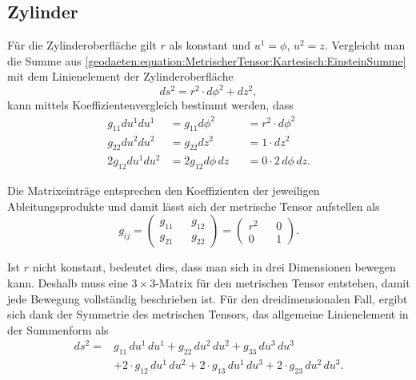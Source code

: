 %
%
%
%
\subsection{Zylinder\label{geodaeten:section:MetrischerTensor:Zylinder}}

Für die Zylinderoberfläche gilt $r$ als konstant und $u^1 = \phi$, $u^2 =z$.
Vergleicht man die Summe aus \eqref{geodaeten:equation:MetrischerTensor:Kartesisch:EinsteinSumme} mit dem Linienelement der Zylinderoberfläche
\begin{equation}
	ds^2 = r^2 \cdot d \phi^2 +dz^2 ,
\end{equation}
kann mittels Koeffizientenvergleich bestimmt werden, dass
\begin{equation}
	\begin{alignedat}{3}
		g_{11}  du^1 du^1 &= g_{11}  d \phi^2 & &= r^2 \cdot d \phi^2 \\
		g_{22}  du^2 du^2 &= g_{22}  dz^2    & &= 1 \cdot dz^2 \\
		2g_{12}  du^1 du^2 &= 2g_{12}  d \phi \, dz & &= 0 \cdot 2 \, d \phi \,  dz.
	\end{alignedat}
\end{equation}

Die Matrixeinträge entsprechen den Koeffizienten der jeweiligen Ableitungsprodukte und damit lässt sich der metrische Tensor aufstellen als
\begin{equation}
	g_{i\!j} =\begin{pmatrix} g_{11} && g_{12} \\ g_{21} && g_{22} \end{pmatrix}= \begin{pmatrix} r^2 && 0 \\ 0 && 1 \end{pmatrix} .
\end{equation}

Ist $r$ nicht konstant, bedeutet dies, dass man sich in drei Dimensionen bewegen kann.
Deshalb muss eine $3 \times 3$-Matrix für den metrischen Tensor entstehen, damit jede Bewegung vollständig beschrieben ist. 
Für den dreidimensionalen Fall, ergibt sich dank der Symmetrie des metrischen Tensors, das allgemeine Linienelement in der Summenform als
\begin{equation}
	\begin{aligned}
		ds^2 = &g_{11} \, du^1 \, du^1 + g_{22} \, du^2 \, du^2 + g_{33} \, du^3 \, du^3 \nonumber \\
		&+ 2 \cdot g_{12} \, du^1 \, du^2 + 2 \cdot g_{13} \, du^1 \, du^3 + 2 \cdot g_{23} \, du^2 \, du^3.
	\end{aligned}
	\label{geodaeten:equation:MetrischerTensor:Kartesisch:EinsteinSumme3D}
\end{equation}

